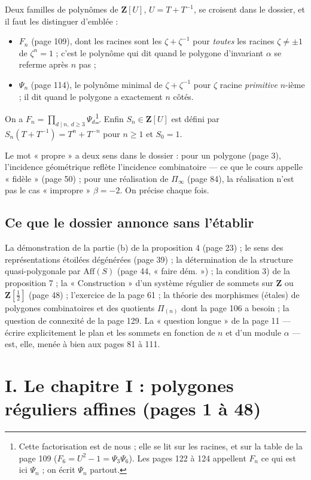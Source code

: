 \documentclass[11pt,a4paper]{article}
\begin{document}
Deux familles de polynômes de $\mathbf{Z}[U]$, $U = T + T^{-1}$, se croisent
dans le dossier, et il faut les distinguer d'emblée :
\begin{itemize}
  \item $F_n$ (page 109), dont les racines sont les $\zeta + \zeta^{-1}$ pour
    \emph{toutes} les racines $\zeta \neq \pm 1$ de $\zeta^n = 1$ ; c'est le
    polynôme qui dit quand le polygone d'invariant $\alpha$ se referme après
    $n$ pas ;
  \item $\Psi_n$ (page 114), le polynôme minimal de $\zeta + \zeta^{-1}$ pour
    $\zeta$ racine \emph{primitive} $n$-ième ; il dit quand le polygone a
    exactement $n$ côtés.
\end{itemize}
On a $F_n = \prod_{d \mid n,\ d \geq 3} \Psi_d$\footnote{Cette factorisation
est de nous ; elle se lit sur les racines, et sur la table de la page 109
($F_6 = U^2 - 1 = \Psi_3 \Psi_6$). Les pages 122 à 124 appellent $F_n$ ce
qui est ici $\Psi_n$ ; on écrit $\Psi_n$ partout.}. Enfin $S_n \in
\mathbf{Z}[U]$ est défini par $S_n(T + T^{-1}) = T^n + T^{-n}$ pour $n \geq 1$
et $S_0 = 1$.

Le mot « propre » a deux sens dans le dossier : pour un polygone (page 3),
l'incidence géométrique reflète l'incidence combinatoire --- ce que le cours
appelle « fidèle » (page 50) ; pour une réalisation de $\Pi_\infty$ (page 84),
la réalisation n'est pas le cas « impropre » $\beta = -2$. On précise chaque
fois.

\subsection*{Ce que le dossier annonce sans l'établir}

La démonstration de la partie (b) de la proposition 4 (page 23) ; le sens des
représentations étoilées dégénérées (page 39) ; la détermination de la
structure quasi-polygonale par $\mathrm{Aff}(S)$ (page 44, « faire dém. ») ;
la condition 3) de la proposition 7 ; la « Construction » d'un système
régulier de sommets sur $\mathbf{Z}$ ou $\mathbf{Z}[\frac12]$ (page 48) ;
l'exercice de la page 61 ; la théorie des morphismes (étales) de polygones
combinatoires et des quotients $\Pi_{(n)}$ dont la page 106 a besoin ; la
question de connexité de la page 129. La « question longue » de la page 11 ---
écrire explicitement le plan et les sommets en fonction de $n$ et d'un module
$\alpha$ --- est, elle, menée à bien aux pages 81 à 111.

\section*{I. Le chapitre I : polygones réguliers affines (pages 1 à 48)}
\end{document}

